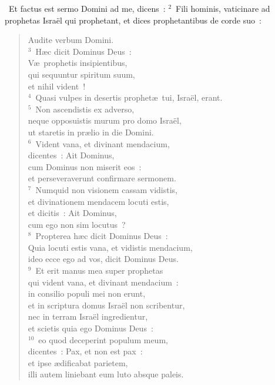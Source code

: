 ~Et factus est sermo Domini ad me, dicens~:
${}^{2}$~Fili hominis, vaticinare ad prophetas Isra\"el qui prophetant, et dices prophetantibus de corde suo~: \begin{flushleft}\begin{verse}Audite verbum Domini.\\
${}^{3}$~H\ae c dicit Dominus Deus~:\\ V\ae\ prophetis insipientibus,\\ qui sequuntur spiritum suum,\\ et nihil vident~!\\
${}^{4}$~Quasi vulpes in desertis prophet\ae\ tui, Isra\"el, erant.\\
${}^{5}$~Non ascendistis ex adverso,\\ neque opposuistis murum pro domo Isra\"el,\\ ut staretis in pr\ae lio in die Domini.\\
${}^{6}$~Vident vana, et divinant mendacium,\\ dicentes~: Ait Dominus,\\ cum Dominus non miserit eos~:\\ et perseveraverunt confirmare sermonem.\\
${}^{7}$~Numquid non visionem cassam vidistis,\\ et divinationem mendacem locuti estis,\\ et dicitis~: Ait Dominus,\\ cum ego non sim locutus~?\\
${}^{8}$~Propterea h\ae c dicit Dominus Deus~:\\ Quia locuti estis vana, et vidistis mendacium,\\ ideo ecce ego ad vos, dicit Dominus Deus.\\
${}^{9}$~Et erit manus mea super prophetas\\ qui vident vana, et divinant mendacium~:\\ in consilio populi mei non erunt,\\ et in scriptura domus Isra\"el non scribentur,\\ nec in terram Isra\"el ingredientur,\\ et scietis quia ego Dominus Deus~:\\
${}^{10}$~eo quod deceperint populum meum,\\ dicentes~: Pax, et non est pax~:\\ et ipse \ae dificabat parietem,\\ illi autem liniebant eum luto absque paleis.\\

\end{verse}
\end{flushleft}
